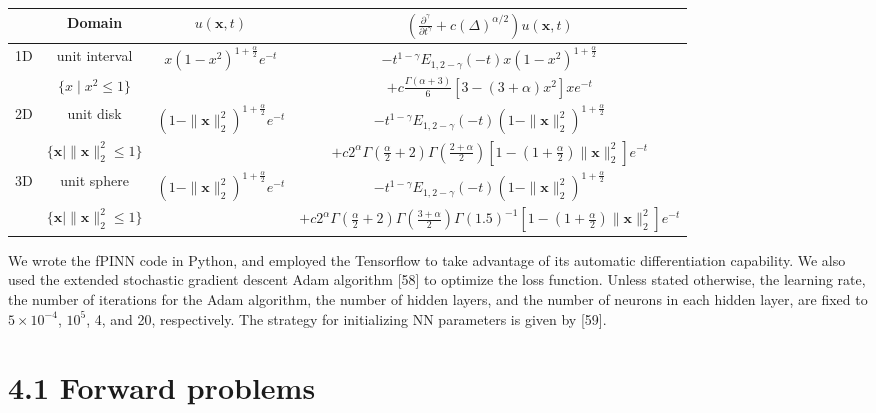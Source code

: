 \documentclass[UTF8]{article}
\begin{document}
\begin{center}
\begin{tabular}{c|c|c|c}
\hline
 & Domain & $u(\boldsymbol{x}, t)$ & $\left(\frac{\partial^\gamma}{\partial t^\gamma} + c(\Delta)^{\alpha/2}\right) u(\boldsymbol{x}, t)$ \\
\hline
1D & unit interval & $x(1-x^2)^{1+\frac{\alpha}{2}}e^{-t}$ & $-t^{1-\gamma}E_{1,2-\gamma}(-t)x(1-x^2)^{1+\frac{\alpha}{2}}$ \\
 & $\{x \mid x^2 \leq 1\}$ & & $+c\frac{\Gamma(\alpha+3)}{6} \left[3-(3+\alpha)x^2\right]xe^{-t}$ \\
\hline
2D & unit disk & $(1-\|\boldsymbol{x}\|_2^2)^{1+\frac{\alpha}{2}}e^{-t}$ & $-t^{1-\gamma}E_{1,2-\gamma}(-t)(1-\|\boldsymbol{x}\|_2^2)^{1+\frac{\alpha}{2}}$ \\
 & $\{\boldsymbol{x} \mid \|\boldsymbol{x}\|_2^2 \leq 1\}$ & & $+c2^\alpha\Gamma(\frac{\alpha}{2}+2)\Gamma(\frac{2+\alpha}{2}) \left[1-(1+\frac{\alpha}{2})\|\boldsymbol{x}\|_2^2\right]e^{-t}$ \\
\hline
3D & unit sphere & $(1-\|\boldsymbol{x}\|_2^2)^{1+\frac{\alpha}{2}}e^{-t}$ & $-t^{1-\gamma}E_{1,2-\gamma}(-t)(1-\|\boldsymbol{x}\|_2^2)^{1+\frac{\alpha}{2}}$ \\
 & $\{\boldsymbol{x} \mid \|\boldsymbol{x}\|_2^2 \leq 1\}$ & & $+c2^\alpha\Gamma(\frac{\alpha}{2}+2)\Gamma(\frac{3+\alpha}{2})\Gamma(1.5)^{-1} \left[1-(1+\frac{\alpha}{2})\|\boldsymbol{x}\|_2^2\right]e^{-t}$ \\
\hline
\end{tabular}
\end{center}

We wrote the fPINN code in Python, and employed the Tensorflow to take advantage of its automatic differentiation capability. We also used the extended stochastic gradient descent Adam algorithm [58] to optimize the loss function. Unless stated otherwise, the learning rate, the number of iterations for the Adam algorithm, the number of hidden layers, and the number of neurons in each hidden layer, are fixed to $5 \times 10^{-4}$, $10^5$, 4, and 20, respectively. The strategy for initializing NN parameters is given by [59].

\section{4.1 Forward problems}
\end{document}
